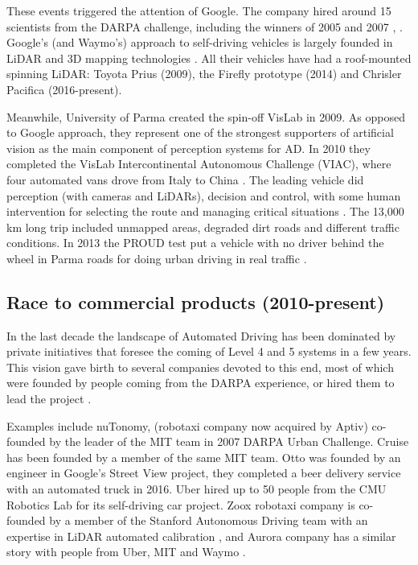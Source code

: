 These events triggered the attention of Google. 
The company hired around 15 scientists from the DARPA challenge, 
including the winners of 2005 and 2007 \cite{Montemerlo2008}, 
\cite{Levinson2011}. Google's (and Waymo's) approach to self-driving vehicles
is largely founded in LiDAR and 3D mapping technologies \cite{Chapell2016}. 
All their vehicles have had a roof-mounted spinning LiDAR: Toyota Prius (2009),
the Firefly prototype (2014) and Chrisler Pacifica (2016-present).

Meanwhile, University of Parma created the spin-off VisLab in 2009. 
As opposed to Google approach, they represent one of the strongest supporters
of artificial vision as the main component of perception systems for AD. 
In 2010 they completed the VisLab Intercontinental Autonomous 
Challenge (VIAC), where four automated vans drove from Italy to China 
\cite{Bertozzi2011}.
The leading vehicle did perception (with cameras and LiDARs), decision and 
control, with some human intervention for selecting the route and managing 
critical situations \cite{Broggi2012}. The 13,000 km long trip included
unmapped areas, degraded dirt roads and different traffic conditions. 
In 2013 the PROUD test put a vehicle with no driver behind the wheel in Parma 
roads for doing urban driving in real traffic \cite{Broggi2013}. 
 
\subsection{Race to commercial products (2010-present)}
 
In the last decade the landscape of Automated Driving has been dominated by 
private initiatives that foresee the coming of Level 4 and 5 systems in a few 
years. This vision gave birth to several companies devoted to this end, most of 
which were founded by people coming from the DARPA experience, or hired them to
lead the project \cite{Chapell2016}. 

Examples include nuTonomy, (robotaxi company now acquired by Aptiv) co-founded
by the leader of the MIT team in 2007 DARPA Urban Challenge. Cruise has been
founded by a member of the same MIT team.
Otto was founded by an engineer in Google's Street View project, they completed
a beer delivery service with an automated truck in 2016.
Uber hired up to 50 people from the CMU Robotics Lab for its self-driving car 
project. Zoox robotaxi company is co-founded by a member of the Stanford 
Autonomous Driving team with an expertise in LiDAR automated calibration 
\cite{Levinson2011a}, and Aurora company has a similar story with people from 
Uber, MIT and Waymo \cite{Anderson2013}.

